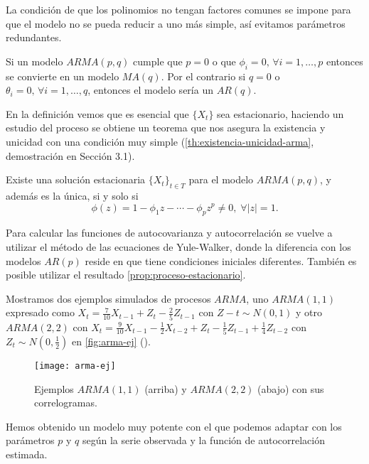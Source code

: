 La condición de que los polinomios no tengan factores comunes se impone para que el modelo no se pueda reducir a uno más simple, así evitamos parámetros redundantes.

Si un modelo $ARMA(p, q)$ cumple que $p = 0$ o que $\phi_i = 0, \, \forall i = 1, \ldots, p$ entonces se convierte en un modelo $MA(q)$. Por el contrario si $q = 0$ o $\theta_i = 0, \, \forall i = 1, \ldots, q$, entonces el modelo sería un $AR(q)$.

En la definición vemos que es esencial que $\{X_t\}$ sea estacionario, haciendo un estudio del proceso se obtiene un teorema que nos asegura la existencia y unicidad con una condición muy simple (\autoref{th:existencia-unicidad-arma}, demostración en \cite{brockwell2002introduction} Sección 3.1).

\begin{teorema}
  Existe una solución estacionaria $\{X_t\}_{t \in T}$ para el modelo $ARMA(p, q)$, y además es la única, si y solo si
  $$\phi(z) = 1 - \phi_1 z - \cdots - \phi_p z^p \neq 0, \; \forall |z| = 1.$$
  \label{th:existencia-unicidad-arma}
\end{teorema}

Para calcular las funciones de autocovarianza y autocorrelación se vuelve a utilizar el método de las ecuaciones de Yule-Walker, donde la diferencia con los modelos $AR(p)$ reside en que tiene condiciones iniciales diferentes. También es posible utilizar el resultado \autoref{prop:proceso-estacionario}.

Mostramos dos ejemplos simulados de procesos $ARMA$, uno $ARMA(1,1)$ expresado como $X_t = \frac{7}{10}X_{t-1} + Z_t - \frac{2}{5}Z_{t-1}$ con $Z-t \sim N(0, 1)$ y otro $ARMA(2,2)$ con $X_t = \frac{9}{10}X_{t-1} - \frac{1}{2}X_{t-2} + Z_t - \frac{1}{5}Z_{t-1} + \frac{1}{4}Z_{t-2}$ con $Z_t \sim N(0, \frac{1}{2})$ en \autoref{fig:arma-ej} (\cite{chatfield2019analysis}).

\begin{figure}[htpb]
  \centering
  \texttt{[image: arma-ej]}
  \caption{Ejemplos $ARMA(1,1)$ (arriba) y $ARMA(2,2)$ (abajo) con sus correlogramas.}
  \label{fig:arma-ej}
\end{figure}

Hemos obtenido un modelo muy potente con el que podemos adaptar con los parámetros $p$ y $q$ según la serie observada y la función de autocorrelación estimada.

